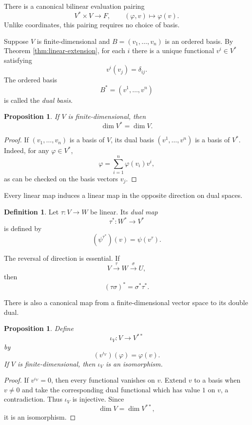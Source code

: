 \documentclass{amsbook}
\newtheorem{proposition}[theorem]{Proposition}
\theoremstyle{definition}
\newtheorem{definition}[theorem]{Definition}
\theoremstyle{remark}
\numberwithin{section}{chapter}
\numberwithin{equation}{chapter}
\begin{document}
There is a canonical bilinear evaluation pairing
\[
V^*\times V\longrightarrow F,
\qquad
(\varphi,v)\longmapsto\varphi(v).
\]
Unlike coordinates, this pairing requires no choice of basis.

Suppose $V$ is finite-dimensional and $B=(v_1,\dots,v_n)$ is an ordered basis. By Theorem \ref{thm:linear-extension}, for each $i$ there is a unique functional $v^i\in V^*$ satisfying
\[
v^i(v_j)=\delta_{ij}.
\]
The ordered basis
\[
B^*=(v^1,\dots,v^n)
\]
is called the \emph{dual basis}.

\begin{proposition}\label{prop:dual-dimension}
If $V$ is finite-dimensional, then
\[
\dim V^*=\dim V.
\]
\end{proposition}

\begin{proof}
If $(v_1,\dots,v_n)$ is a basis of $V$, its dual basis $(v^1,\dots,v^n)$ is a basis of $V^*$. Indeed, for any $\varphi\in V^*$,
\[
\varphi=\sum_{i=1}^n\varphi(v_i)v^i,
\]
as can be checked on the basis vectors $v_j$.
\end{proof}

Every linear map induces a linear map in the opposite direction on dual spaces.

\begin{definition}
Let $\tau\colon V\to W$ be linear. Its \emph{dual map}
\[
\tau^*\colon W^*\longrightarrow V^*
\]
is defined by
\[
(\psi^{\tau^*})(v)=\psi(v^\tau).
\]
\end{definition}

The reversal of direction is essential. If
\[
V\xrightarrow{\tau}W\xrightarrow{\sigma}U,
\]
then
\[
(\tau\sigma)^*=\sigma^*\tau^*.
\]

There is also a canonical map from a finite-dimensional vector space to its double dual.

\begin{proposition}\label{prop:double-dual}
Define
\[
\iota_V\colon V\longrightarrow V^{**}
\]
by
\[
(v^{\iota_V})(\varphi)=\varphi(v).
\]
If $V$ is finite-dimensional, then $\iota_V$ is an isomorphism.
\end{proposition}

\begin{proof}
If $v^{\iota_V}=0$, then every functional vanishes on $v$. Extend $v$ to a basis when $v\neq0$ and take the corresponding dual functional which has value $1$ on $v$, a contradiction. Thus $\iota_V$ is injective. Since
\[
\dim V=\dim V^{**},
\]
it is an isomorphism.
\end{proof}
\end{document}
